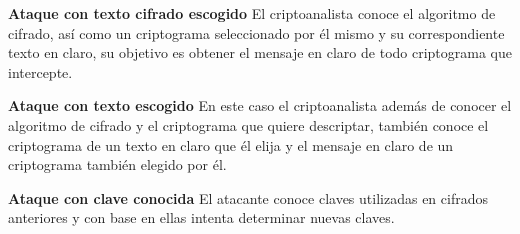 \textbf{Ataque con texto cifrado escogido}
El criptoanalista conoce el algoritmo de cifrado, así como un criptograma seleccionado por él mismo y su correspondiente texto en claro, su objetivo es obtener el mensaje en claro de todo criptograma que intercepte.

\textbf{Ataque con texto escogido}
En este caso el criptoanalista además de conocer el algoritmo de cifrado y el criptograma que quiere descriptar, también conoce el criptograma de un texto en claro que él elija y el mensaje en claro de un criptograma también elegido por él.


\textbf{Ataque con clave conocida}
El atacante conoce claves utilizadas en cifrados anteriores y con base en ellas intenta determinar nuevas claves.



